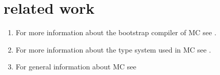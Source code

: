 \section{related work}

\begin{enumerate}
   \item For more information about the bootstrap compiler of MC see \cite{jarnospaper}.
   \item For more information about the type system used in MC see \cite{douwespaper}.
   \item For general information about MC see \cite{websitemc}
\end{enumerate}
